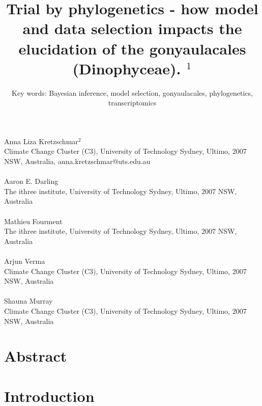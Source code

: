 \documentclass[12pt]{article}
\title{Trial by phylogenetics - how model and data selection impacts the elucidation of the gonyaulacales (Dinophyceae). $^{1}$}
\author{Key words: Bayesian inference, model selection, gonyaulacales, phylogenetics, transcriptomics}
\date{}
\begin{document}
\maketitle
\paragraph{}Anna Liza Kretzschmar$^{2}$\\
Climate Change Cluster (C3), University of Technology Sydney, Ultimo, 2007 NSW, Australia, anna.kretzschmar@uts.edu.au
\paragraph{}Aaron E. Darling \\
The ithree institute, University of Technology Sydney, Ultimo, 2007 NSW, Australia
\paragraph{}Mathieu Fourment \\
The ithree institute, University of Technology Sydney, Ultimo, 2007 NSW, Australia
\paragraph{}Arjun Verma\\
Climate Change Cluster (C3), University of Technology Sydney, Ultimo, 2007 NSW, Australia
\paragraph{}Shauna Murray\\ 
Climate Change Cluster (C3), University of Technology Sydney, Ultimo, 2007 NSW, Australia
\newpage
\section{Abstract}
\newpage

\section{Introduction}


\end{document}
